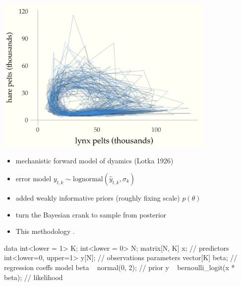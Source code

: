\documentclass[10pt]{report}
\begin{document}
\begin{center}
\includegraphics[width=0.8\textwidth]{img/lotka-volterra-posterior-time.png}
\end{center}

\begin{itemize}
\item mechanistic forward model of dyamics (Lotka 1926)
\item error model $y_{t,k} \sim \textrm{lognormal}(\hat{y}_{t,k}, \sigma_k)$
\item added weakly informative priors (roughly fixing scale) $p(\theta)$
\item turn the Bayesian crank to sample from posterior
\item This methodology .
\end{itemize}


%
\begin{stancode}
 data {
   int<lower = 1> K;
   int<lower = 0> N;
   matrix[N, K] x;                  // predictors
   int<lower=0, upper=1> y[N];      // observations
 }
 parameters {
   vector[K] beta;                  // regression coeffs
 }
 model {
   beta ~ normal(0, 2);            // prior
   y ~ bernoulli_logit(x * beta);  // likelihood
 }
\end{stancode}
\end{document}
